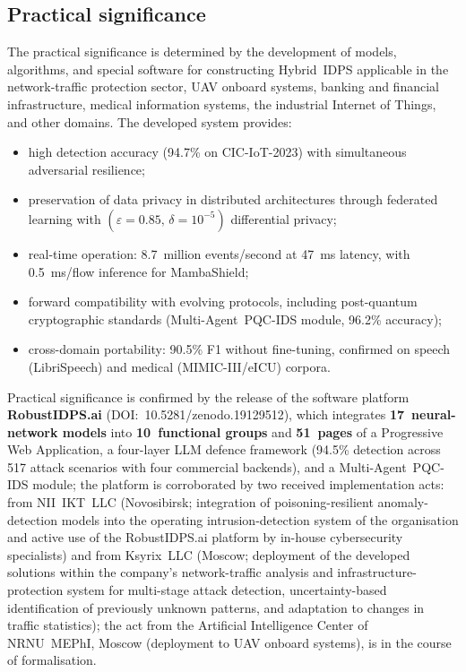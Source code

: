 \documentclass[12pt,a5paper]{article}
\begin{document}
\subsection*{Practical significance}

The practical significance is determined by the development of
models, algorithms, and special software for constructing
Hybrid~IDPS applicable in the network-traffic protection
sector, UAV onboard systems, banking and financial
infrastructure, medical information systems, the industrial
Internet of Things, and other domains. The developed system
provides:

\begin{itemize}
\item high detection accuracy (94.7\% on CIC-IoT-2023) with
simultaneous adversarial resilience;
\item preservation of data privacy in distributed architectures
through federated learning with
$(\varepsilon{=}0.85,\,\delta{=}10^{-5})$ differential privacy;
\item real-time operation: 8.7~million events/second at 47~ms
latency, with 0.5~ms/flow inference for MambaShield;
\item forward compatibility with evolving protocols, including
post-quantum cryptographic standards (Multi-Agent~PQC-IDS
module, 96.2\% accuracy);
\item cross-domain portability: 90.5\% F1 without fine-tuning,
confirmed on speech (LibriSpeech) and medical (MIMIC-III/eICU)
corpora.
\end{itemize}

Practical significance is confirmed by the release of the
software platform \textbf{RobustIDPS.ai}
(DOI:~10.5281/zenodo.19129512), which integrates
\textbf{17~neural-network models} into \textbf{10~functional
groups} and \textbf{51~pages} of a Progressive Web Application,
a four-layer LLM defence framework (94.5\% detection across
517 attack scenarios with four commercial backends), and a
Multi-Agent~PQC-IDS module; the platform is corroborated by
two received implementation acts: from NII~IKT~LLC (Novosibirsk;
integration of poisoning-resilient anomaly-detection models into
the operating intrusion-detection system of the organisation and
active use of the RobustIDPS.ai platform by in-house cybersecurity
specialists) and from Ksyrix~LLC (Moscow; deployment of the
developed solutions within the company's network-traffic
analysis and infrastructure-protection system for multi-stage
attack detection, uncertainty-based identification of previously
unknown patterns, and adaptation to changes in traffic
statistics); the act from the Artificial Intelligence Center of
NRNU~MEPhI, Moscow (deployment to UAV onboard systems), is in
the course of formalisation.
\end{document}
